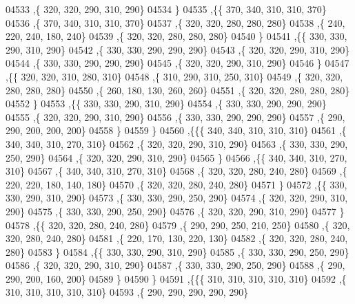 \begin{DoxyCode}
04533     ,\{   320,   320,   290,   310,   290\}
04534     \}
04535    ,\{\{   370,   340,   310,   310,   370\}
04536     ,\{   370,   340,   310,   310,   370\}
04537     ,\{   320,   320,   280,   280,   280\}
04538     ,\{   240,   220,   240,   180,   240\}
04539     ,\{   320,   320,   280,   280,   280\}
04540     \}
04541    ,\{\{   330,   330,   290,   310,   290\}
04542     ,\{   330,   330,   290,   290,   290\}
04543     ,\{   320,   320,   290,   310,   290\}
04544     ,\{   330,   330,   290,   290,   290\}
04545     ,\{   320,   320,   290,   310,   290\}
04546     \}
04547    ,\{\{   320,   320,   310,   280,   310\}
04548     ,\{   310,   290,   310,   250,   310\}
04549     ,\{   320,   320,   280,   280,   280\}
04550     ,\{   260,   180,   130,   260,   260\}
04551     ,\{   320,   320,   280,   280,   280\}
04552     \}
04553    ,\{\{   330,   330,   290,   310,   290\}
04554     ,\{   330,   330,   290,   290,   290\}
04555     ,\{   320,   320,   290,   310,   290\}
04556     ,\{   330,   330,   290,   290,   290\}
04557     ,\{   290,   290,   200,   200,   200\}
04558     \}
04559    \}
04560   ,\{\{\{   340,   340,   310,   310,   310\}
04561     ,\{   340,   340,   310,   270,   310\}
04562     ,\{   320,   320,   290,   310,   290\}
04563     ,\{   330,   330,   290,   250,   290\}
04564     ,\{   320,   320,   290,   310,   290\}
04565     \}
04566    ,\{\{   340,   340,   310,   270,   310\}
04567     ,\{   340,   340,   310,   270,   310\}
04568     ,\{   320,   320,   280,   240,   280\}
04569     ,\{   220,   220,   180,   140,   180\}
04570     ,\{   320,   320,   280,   240,   280\}
04571     \}
04572    ,\{\{   330,   330,   290,   310,   290\}
04573     ,\{   330,   330,   290,   250,   290\}
04574     ,\{   320,   320,   290,   310,   290\}
04575     ,\{   330,   330,   290,   250,   290\}
04576     ,\{   320,   320,   290,   310,   290\}
04577     \}
04578    ,\{\{   320,   320,   280,   240,   280\}
04579     ,\{   290,   290,   250,   210,   250\}
04580     ,\{   320,   320,   280,   240,   280\}
04581     ,\{   220,   170,   130,   220,   130\}
04582     ,\{   320,   320,   280,   240,   280\}
04583     \}
04584    ,\{\{   330,   330,   290,   310,   290\}
04585     ,\{   330,   330,   290,   250,   290\}
04586     ,\{   320,   320,   290,   310,   290\}
04587     ,\{   330,   330,   290,   250,   290\}
04588     ,\{   290,   290,   200,   160,   200\}
04589     \}
04590    \}
04591   ,\{\{\{   310,   310,   310,   310,   310\}
04592     ,\{   310,   310,   310,   310,   310\}
04593     ,\{   290,   290,   290,   290,   290\}

\end{DoxyCode}
